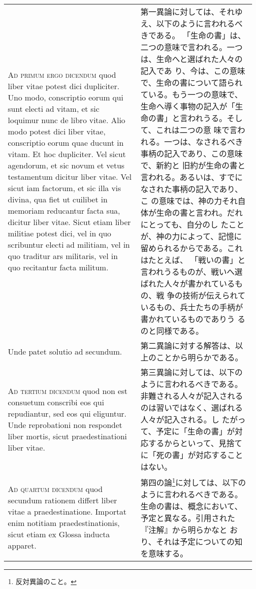 \documentclass[10pt]{jsarticle} %
\begin{document}
\begin{longtable}{p{21em}p{21em}}
\\



{\scshape Ad primum ergo dicendum} quod liber vitae
 potest dici dupliciter. Uno modo, conscriptio eorum qui sunt electi ad
 vitam, et sic loquimur nunc de libro vitae. Alio modo potest dici liber
 vitae, conscriptio eorum quae ducunt in vitam. Et hoc dupliciter. Vel
 sicut agendorum, et sic novum et vetus testamentum dicitur liber
 vitae. Vel sicut iam factorum, et sic illa vis divina, qua fiet ut
 cuilibet in memoriam reducantur facta sua, dicitur liber vitae. Sicut
 etiam liber militiae potest dici, vel in quo scribuntur electi ad
 militiam, vel in quo traditur ars militaris, vel in quo recitantur
 facta militum.


&

第一異論に対しては、それゆえ、以下のように言われるべきである。
「生命の書」は、二つの意味で言われる。一つは、生命へと選ばれた人々の記入であ
 り、今は、この意味で、生命の書について語られている。もう一つの意味で、
 生命へ導く事物の記入が「生命の書」と言われうる。そして、これは二つの意
 味で言われる。一つは、なされるべき事柄の記入であり、この意味で、新約と
 旧約が生命の書と言われる。あるいは、すでになされた事柄の記入であり、こ
 の意味では、神の力それ自体が生命の書と言われ。だれにとっても、自分のし
 たことが、神の力によって、記憶に留められるからである。これはたとえば、
「戦いの書」と言われうるものが、戦いへ選ばれた人々が書かれているもの、戦
 争の技術が伝えられているもの、兵士たちの手柄が書かれているものでありう
 るのと同様である。

\\



Unde patet solutio ad secundum.


&

第二異論に対する解答は、以上のことから明らかである。

\\



{\scshape Ad tertium dicendum} quod non est consuetum
 conscribi eos qui repudiantur, sed eos qui eliguntur. Unde reprobationi
 non respondet liber mortis, sicut praedestinationi liber vitae.


&

第三異論に対しては、以下のように言われるべきである。
非難される人々が記入されるのは習いではなく、選ばれる人々が記入される。し
 たがって、予定に「生命の書」が対応するからといって、見捨てに「死の書」が対応することはない。

\\



{\scshape Ad quartum dicendum} quod secundum rationem
 differt liber vitae a praedestinatione. Importat enim notitiam
 praedestinationis, sicut etiam ex Glossa inducta apparet.


&

第四の論\footnote{反対異論のこと。}に対しては、以下のように言われるべきである。
生命の書は、概念において、予定と異なる。引用された『注解』から明らかなと
 おり、それは予定についての知を意味する。


\end{longtable}
\newpage
\end{document}
